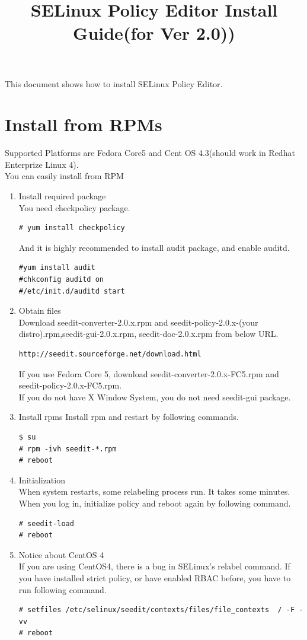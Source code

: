 \documentclass{article}
\title{SELinux Policy Editor Install Guide(for Ver 2.0))}
\begin{document}
\def\labelenumi{(\theenumi)}
\maketitle
\tableofcontents
\newpage

This document shows how to install SELinux Policy Editor.

\section{Install from RPMs}\label{sec:rpm}
Supported Platforms are Fedora Core5 and Cent OS 4.3(should work in Redhat
Enterprize Linux 4).\\

You can easily install from RPM
\begin{enumerate}
 \item Install required package\\
       You need checkpolicy package.
\begin{verbatim}
# yum install checkpolicy		
\end{verbatim}
And it is highly recommended to install audit package, and enable
       auditd.
\begin{verbatim}
#yum install audit
#chkconfig auditd on
#/etc/init.d/auditd start
\end{verbatim}


    \item Obtain files\\
Download seedit-converter-2.0.x.rpm and seedit-policy-2.0.x-(your
	  distro).rpm,seedit-gui-2.0.x.rpm, seedit-doc-2.0.x.rpm 
from below URL.
\begin{verbatim}
http://seedit.sourceforge.net/download.html
\end{verbatim}
If you use Fedora Core 5, download seedit-converter-2.0.x-FC5.rpm and
       seedit-policy-2.0.x-FC5.rpm.\\
If you do not have X Window System, you do not need seedit-gui package.

 \item Install rpms
Install rpm and restart by following commands.
\begin{verbatim}
$ su 
# rpm -ivh seedit-*.rpm
# reboot
\end{verbatim}
 \item Initialization\\ \label{item:init}
When system restarts, some relabeling process run. It takes some
	  minutes. When you log in, initialize policy and reboot again by following
	  command. 
\begin{verbatim}
# seedit-load
# reboot
\end{verbatim}
\item Notice about CentOS 4\\ 
If you are using CentOS4, there is a bug in SELinux's relabel command.
If you have installed strict policy, or have enabled RBAC before, 
you have to run following command.
\begin{verbatim}
# setfiles /etc/selinux/seedit/contexts/files/file_contexts  / -F -vv
# reboot
\end{verbatim}


\end{enumerate}
\end{document}
